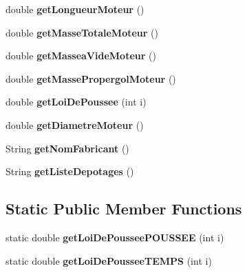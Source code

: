 \begin{DoxyCompactItemize}
\item 
\mbox{\label{classpackage_i_h_m_1_1_x_m_l_reader_a4078157e5154dbcbd144d0d392932794}} 
double {\bfseries get\+Longueur\+Moteur} ()
\item 
\mbox{\label{classpackage_i_h_m_1_1_x_m_l_reader_aabb838637b0d576ee8913cf0b6eb3ca3}} 
double {\bfseries get\+Masse\+Totale\+Moteur} ()
\item 
\mbox{\label{classpackage_i_h_m_1_1_x_m_l_reader_ab57b1b50cc2cf5b89f6358a336a96148}} 
double {\bfseries get\+Massea\+Vide\+Moteur} ()
\item 
\mbox{\label{classpackage_i_h_m_1_1_x_m_l_reader_a147f1da5ea9ba4b08869b6227cdefcc1}} 
double {\bfseries get\+Masse\+Propergol\+Moteur} ()
\item 
\mbox{\label{classpackage_i_h_m_1_1_x_m_l_reader_a2a5cd428a1d1fb7018093635c82ef2c0}} 
double {\bfseries get\+Loi\+De\+Poussee} (int i)
\item 
\mbox{\label{classpackage_i_h_m_1_1_x_m_l_reader_a6dc2ef034a170d09cc4fcea919639392}} 
double {\bfseries get\+Diametre\+Moteur} ()
\item 
\mbox{\label{classpackage_i_h_m_1_1_x_m_l_reader_ab5dbf5538d8c4a579c433d484360f61a}} 
String {\bfseries get\+Nom\+Fabricant} ()
\item 
\mbox{\label{classpackage_i_h_m_1_1_x_m_l_reader_a767d4c4773c6973c6acbaf15f93ca320}} 
String {\bfseries get\+Liste\+Depotages} ()
\end{DoxyCompactItemize}
\subsection*{Static Public Member Functions}
\begin{DoxyCompactItemize}
\item 
\mbox{\label{classpackage_i_h_m_1_1_x_m_l_reader_ab14588c7051a567e4941a8ef17509994}} 
static double {\bfseries get\+Loi\+De\+Poussee\+P\+O\+U\+S\+S\+EE} (int i)
\item 
\mbox{\label{classpackage_i_h_m_1_1_x_m_l_reader_ad4efb6130c44c8ef97f09d8e40a786a7}} 
static double {\bfseries get\+Loi\+De\+Poussee\+T\+E\+M\+PS} (int i)
\end{DoxyCompactItemize}


